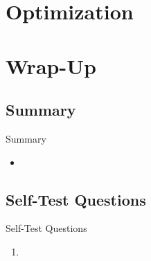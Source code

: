 % 
\begin{frame}{}{}

\end{frame}


\section{Optimization}

% 
\begin{frame}{}{}

\end{frame}


\section{Wrap-Up}

\subsection{Summary}

\begin{frame}{Summary}{}
	\begin{itemize}
		\item
	\end{itemize}
\end{frame}


\subsection{Self-Test Questions}

\begin{frame}{Self-Test Questions}{}\important
	\begin{enumerate}
		\item 
	\end{enumerate}
\end{frame}


